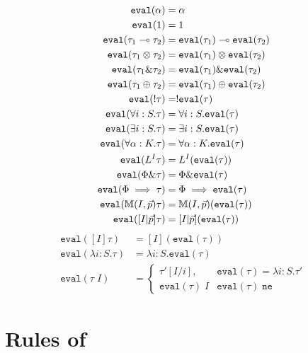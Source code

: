 \begin{align*}
\texttt{eval}(\alpha) &= \alpha\\
\texttt{eval}(1) &= 1\\
\texttt{eval}(\tau_1 \multimap \tau_2) &= \texttt{eval}(\tau_1) \multimap \texttt{eval}(\tau_2)\\
\texttt{eval}(\tau_1 \otimes \tau_2) &= \texttt{eval}(\tau_1) \otimes \texttt{eval}(\tau_2)\\
\texttt{eval}(\tau_1 \& \tau_2) &= \texttt{eval}(\tau_1) \& \texttt{eval}(\tau_2)\\
\texttt{eval}(\tau_1 \oplus \tau_2) &= \texttt{eval}(\tau_1) \oplus \texttt{eval}(\tau_2)\\
\texttt{eval}(!\tau) &= !\texttt{eval}(\tau)\\
\texttt{eval}(\forall i : S. \tau) &= \forall i : S. \texttt{eval}(\tau)\\
\texttt{eval}(\exists i : S. \tau) &= \exists i : S. \texttt{eval}(\tau)\\
\texttt{eval}(\forall \alpha : K. \tau) &= \forall \alpha : K. \texttt{eval}(\tau)\\
\texttt{eval}(L^I\tau) &= L^I(\texttt{eval}(\tau))\\
\texttt{eval}(\Phi \& \tau) &= \Phi \& \texttt{eval}(\tau)\\
\texttt{eval}(\Phi \implies \tau) &= \Phi \implies \texttt{eval}(\tau)\\
\texttt{eval}(\mathbb{M}(I,\vec{p})\tau) &= \mathbb{M}(I,\vec{p})(\texttt{eval}(\tau))\\
\texttt{eval}([I|\vec{p}]\tau) &= [I|\vec{p}](\texttt{eval}(\tau))
\end{align*}
\begin{align*}
\texttt{eval}([I]\tau) &= [I](\texttt{eval}(\tau))\\
\texttt{eval}(\lambda i : S. \tau) &= \lambda i : S. \texttt{eval}(\tau)\\
\texttt{eval}(\tau \; I) &= \begin{cases}
   \tau'[I/i], & \texttt{eval}(\tau) = \lambda i : S. \tau' \\
   \texttt{eval}(\tau) \; I & \texttt{eval}(\tau) \; \texttt{ne}
                              \end{cases}
\end{align*}
\section{Rules of \bilambdaamor}

